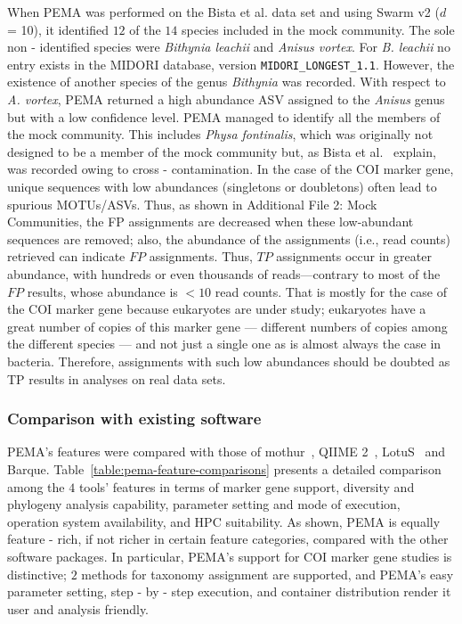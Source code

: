       When PEMA was performed on the Bista et al. data set \citep{bista2018performance} and using Swarm v2 ($d$ = 10), it identified $12$ of the $14$ species included in the mock community. 
      The sole non - identified species were \textit{Bithynia leachii} and \textit{Anisus vortex}. For \textit{B. leachii} no entry exists in the MIDORI database, version \texttt{MIDORI\_LONGEST\_1.1}. 
      However, the existence of another species of the genus \textit{Bithynia} was recorded. 
      With respect to \textit{A. vortex}, PEMA returned a high abundance ASV assigned to the \textit{Anisus} genus but with a low confidence level. 
      PEMA managed to identify all the members of the mock community. 
      This includes \textit{Physa fontinalis}, which was originally not designed to be a member of the mock community but, as Bista et al.~\citep{bista2018performance} explain, was recorded owing to cross - contamination. 
      In the case of the COI marker gene, unique sequences with low abundances (singletons or doubletons) often lead to spurious MOTUs/ASVs. 
      Thus, as shown in Additional File 2: Mock Communities, the FP assignments are decreased when these low-abundant sequences are removed; 
      also, the abundance of the assignments (i.e., read counts) retrieved can indicate $FP$ assignments. 
      Thus, $TP$ assignments occur in greater abundance, with hundreds or even thousands of reads—contrary to most of the $FP$ results, whose abundance is $<10$ read counts. 
      That is mostly for the case of the COI marker gene because eukaryotes are under study; 
      eukaryotes have a great number of copies of this marker gene — different numbers of copies among the different species — and not just a single one as is almost always the case in bacteria. 
      Therefore, assignments with such low abundances should be doubted as TP results in analyses on real data sets.


   \subsubsection{Comparison with existing software}

      PEMA's features were compared with those of mothur~\citep{schloss2009introducing}, QIIME 2~\citep{bolyen2018qiime}, LotuS~\citep{hildebrand2014lotus} and Barque. 
      Table~\ref{table:pema-feature-comparisons} presents a detailed comparison among the $4$ tools' features in terms of marker gene support, diversity and phylogeny analysis capability, parameter setting and mode of execution, operation system availability, and HPC suitability. 
      As shown, PEMA is equally feature - rich, if not richer in certain feature categories, compared with the other software packages. In particular, PEMA's support for COI marker gene studies is distinctive; 
      $2$ methods for taxonomy assignment are supported, and PEMA's easy parameter setting, step - by - step execution, and container distribution render it user and analysis friendly.

